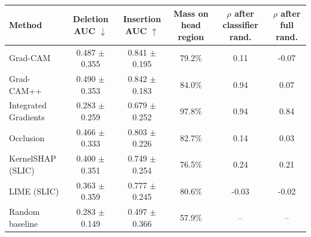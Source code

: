 \begin{tabular}{lccccc}
\toprule
Method & Deletion AUC $\downarrow$ & Insertion AUC $\uparrow$ & Mass on head region & $\rho$ after classifier rand. & $\rho$ after full rand. \\
\midrule
Grad-CAM & 0.487 $\pm$ 0.355 & 0.841 $\pm$ 0.195 & 79.2\% & 0.11 & -0.07 \\
Grad-CAM++ & 0.490 $\pm$ 0.353 & 0.842 $\pm$ 0.183 & 84.0\% & 0.94 & 0.07 \\
Integrated Gradients & 0.283 $\pm$ 0.259 & 0.679 $\pm$ 0.252 & 97.8\% & 0.94 & 0.84 \\
Occlusion & 0.466 $\pm$ 0.333 & 0.803 $\pm$ 0.226 & 82.7\% & 0.14 & 0.03 \\
KernelSHAP (SLIC) & 0.400 $\pm$ 0.351 & 0.749 $\pm$ 0.254 & 76.5\% & 0.24 & 0.21 \\
LIME (SLIC) & 0.363 $\pm$ 0.359 & 0.777 $\pm$ 0.245 & 80.6\% & -0.03 & -0.02 \\
Random baseline & 0.283 $\pm$ 0.149 & 0.497 $\pm$ 0.366 & 57.9\% & -- & -- \\
\bottomrule
\end{tabular}